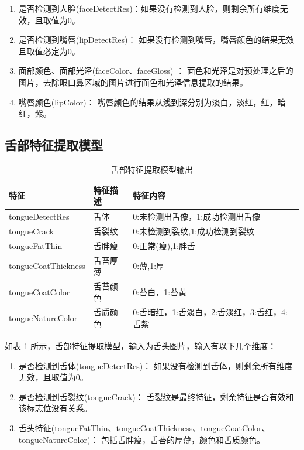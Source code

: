 \begin{enumerate}
    \item 是否检测到人脸(faceDetectRes)：如果没有检测到人脸，则剩余所有维度无效，且取值为0。

    \item 是否检测到嘴唇(lipDetectRes)： 如果没有检测到嘴唇，嘴唇颜色的结果无效且取值必定为0。

    \item 面部颜色、面部光泽(faceColor、faceGloss) ： 面色和光泽是对预处理之后的图片，去除眼口鼻区域的图片进行面色和光泽信息提取的结果。

    \item 嘴唇颜色(lipColor)： 嘴唇颜色的结果从浅到深分别为淡白，淡红，红，暗红，紫。
\end{enumerate}


\subsection{舌部特征提取模型}

\begin{table}[h]
    \centering
    \begin{tabular}{lll}
        \toprule
        特征 & 特征描述 & 特征内容 \\ 
        \midrule
        tongueDetectRes & 舌体 & 0:未检测出舌像，1:成功检测出舌像 \\
        tongueCrack & 舌裂纹 & 0:未检测到裂纹,1:成功检测到裂纹 \\ 
        tongueFatThin & 舌胖瘦 & 0:正常(瘦),1:胖舌 \\
        tongueCoatThickness & 舌苔厚薄 & 0:薄,1:厚 \\
        tongueCoatColor & 舌苔颜色 & 0:苔白，1:苔黄 \\
        tongueNatureColor & 舌质颜色 & 0:舌暗红，1:舌淡白，2:舌淡红，3:舌红，4:舌紫\\
        \bottomrule
    \end{tabular}

    \caption{舌部特征提取模型输出}
    \label{tab:tongue-feature}
\end{table}

如表 \ref{tab:tongue-feature} 所示，舌部特征提取模型，输入为舌头图片，输入有以下几个维度：

\begin{enumerate}
    \item 是否检测到舌体(tongueDetectRes)： 如果没有检测到舌体，则剩余所有维度无效，且取值为0。

    \item 是否检测到舌裂纹(tongueCrack)： 舌裂纹是最终特征，剩余特征是否有效和该标志位没有关系。

    \item 舌头特征(tongueFatThin、tongueCoatThickness、tongueCoatColor、tongueNatureColor)： 包括舌胖瘦，舌苔的厚薄，颜色和舌质颜色。

\end{enumerate}

